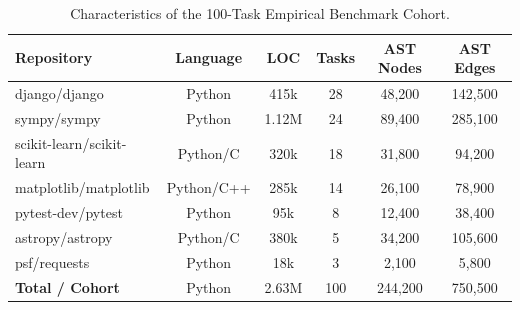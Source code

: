 \begin{table}[t]
\centering
\small
\caption{Characteristics of the 100-Task Empirical Benchmark Cohort.}
\label{tab:cohort}
\begin{tabular}{lccccc}
\toprule
\textbf{Repository} & \textbf{Language} & \textbf{LOC} & \textbf{Tasks} & \textbf{AST Nodes} & \textbf{AST Edges} \\
\midrule
django/django & Python & 415k & 28 & 48,200 & 142,500 \\
sympy/sympy & Python & 1.12M & 24 & 89,400 & 285,100 \\
scikit-learn/scikit-learn & Python/C & 320k & 18 & 31,800 & 94,200 \\
matplotlib/matplotlib & Python/C++ & 285k & 14 & 26,100 & 78,900 \\
pytest-dev/pytest & Python & 95k & 8 & 12,400 & 38,400 \\
astropy/astropy & Python/C & 380k & 5 & 34,200 & 105,600 \\
psf/requests & Python & 18k & 3 & 2,100 & 5,800 \\
\midrule
\textbf{Total / Cohort} & Python & 2.63M & 100 & 244,200 & 750,500 \\
\bottomrule
\end{tabular}
\end{table}
